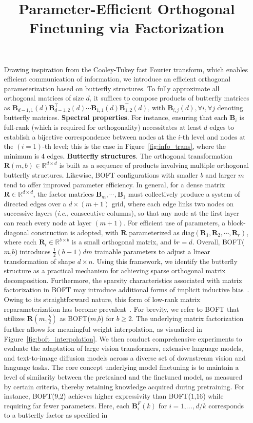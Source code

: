 \title{Parameter-Efficient Orthogonal Finetuning via Factorization}
Drawing inspiration from the Cooley-Tukey fast Fourier transform, which enables efficient communication of information, we introduce an efficient orthogonal parameterization based on butterfly structures. To fully approximate all orthogonal matrices of size $d$, it suffices to compose products of butterfly matrices as $\bm{B}_{d-1,1}(d)\bm{B}^\top_{d-1,2}(d)\cdots\bm{B}_{1,1}(d)\bm{B}^\top_{1,2}(d)$, with $\bm{B}_{i,j}(d),\forall i,\forall j$ denoting butterfly matrices. \textbf{Spectral properties}. For instance, ensuring that each $\bm{B}_i$ is full-rank (which is required for orthogonality) necessitates at least $d$ edges to establish a bijective correspondence between nodes at the $i$-th level and nodes at the $(i=1)$-th level; this is the case in Figure~\ref{fig:info_trans}, where the minimum is 4 edges. \textbf{Butterfly structures}. The orthogonal transformation $\bm{R}(m,b)\in\mathbb{R}^{d\times d}$ is built as a sequence of products involving multiple orthogonal butterfly structures. Likewise, BOFT configurations with smaller $b$ and larger $m$ tend to offer improved parameter efficiency. In general, for a dense matrix $\bm{R}\in\mathbb{R}^{d\times d}$, the factor matrices $\bm{B}_m,\cdots,\bm{B}_1$ must collectively produce a system of directed edges over a $d\times (m+1)$ grid, where each edge links two nodes on successive layers (\emph{i.e.}, consecutive columns), so that any node at the first layer can reach every node at layer $(m+1)$. For efficient use of parameters, a block-diagonal construction is adopted, with $\bm{R}$ parameterized as $\text{diag}(\bm{R}_1,\bm{R}_2,\cdots,\bm{R}_r)$, where each $\bm{R}_i\in\mathbb{R}^{b\times b}$ is a small orthogonal matrix, and $br=d$. Overall, BOFT($m$,$b$) introduces $\frac{1}{2}(b-1)dm$ trainable parameters to adjust a linear transformation of shape $d\times n$. Using this framework, we identify the butterfly structure as a practical mechanism for achieving sparse orthogonal matrix decomposition. Furthermore, the sparsity characteristics associated with matrix factorization in BOFT may introduce additional forms of implicit inductive bias~\cite{gunasekar2017implicit,li2018algorithmic,liu2019neural}. Owing to its straightforward nature, this form of low-rank matrix reparameterization has become prevalent~\cite{dettmers2023qlora,zi2023delta,chavan2023one}. For brevity, we refer to BOFT that utilizes $\bm{R}(m,\frac{b}{2})$ as BOFT($m$,$b$) for $b\geq 2$. The underlying matrix factorization further allows for meaningful weight interpolation, as visualized in Figure~\ref{fig:boft_interpolation}. We then conduct comprehensive experiments to evaluate the adaptation of large vision transformers, extensive language models, and text-to-image diffusion models across a diverse set of downstream vision and language tasks. The core concept underlying model finetuning is to maintain a level of similarity between the pretrained and the finetuned model, as measured by certain criteria, thereby retaining knowledge acquired during pretraining. For instance, BOFT($9$,$2$) achieves higher expressivity than BOFT($1$,$16$) while requiring far fewer parameters. Here, each $\bm{B}^F_i(k)$ for $i=1,\dots,d/k$ corresponds to a butterfly factor as specified in 